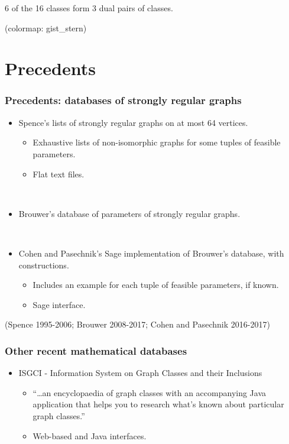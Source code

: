 \documentclass[pdf,sprung,slideColor,nocolorBG]{beamer}
\newenvironment{colortheme}[1]{
\def\ProvidesPackageRCS $##1${\relax}
\renewcommand{\ProcessOptions}{\relax}
\makeatletter

\makeatother
}{}
\newcommand{\slidecite}[1]{\tiny{(#1)}\normalsize{}}
\begin{document}
\begin{colortheme}{jubata}
\begin{frame}
\begin{figure}
\begin{minipage}{.48\textwidth}
  \label{fig:psf_9_5439_dual_cayley_graph_index_matrix}
\end{minipage}%
\end{figure}
6 of the 16 classes form 3 dual pairs of classes.

\slidecite{colormap: gist\_stern}
\end{frame}

\end{colortheme}

\section{Precedents}

\begin{colortheme}{seagull}
\begin{frame}
\frametitle{Precedents: databases of strongly regular graphs}
\begin{itemize}
 \item
Spence's lists of strongly regular graphs on at most 64 vertices.
 \begin{itemize}
  \item
Exhaustive lists of non-isomorphic graphs for some tuples of feasible parameters.
  \item
Flat text files.
 \end{itemize}

~

 \item
Brouwer's database of parameters of strongly regular graphs.

~

 \item
Cohen and Pasechnik's Sage implementation of Brouwer's database, with constructions.
 \begin{itemize}
  \item
Includes an example for each tuple of feasible parameters, if known.
  \item
Sage interface.
 \end{itemize}
\end{itemize}
\slidecite{Spence 1995-2006; Brouwer 2008-2017; Cohen and Pasechnik 2016-2017}
\end{frame}

\begin{frame}
\frametitle{Other recent mathematical databases}
\begin{itemize}
 \item
ISGCI - Information System on Graph Classes and their Inclusions
 \begin{itemize}
  \item
``\ldots an encyclopaedia of graph classes with an accompanying Java application that helps you to research what's known about particular graph classes.''
  \item
Web-based and Java interfaces.
 \end{itemize}


\end{itemize}
\end{frame}
\end{colortheme}
\end{document}
